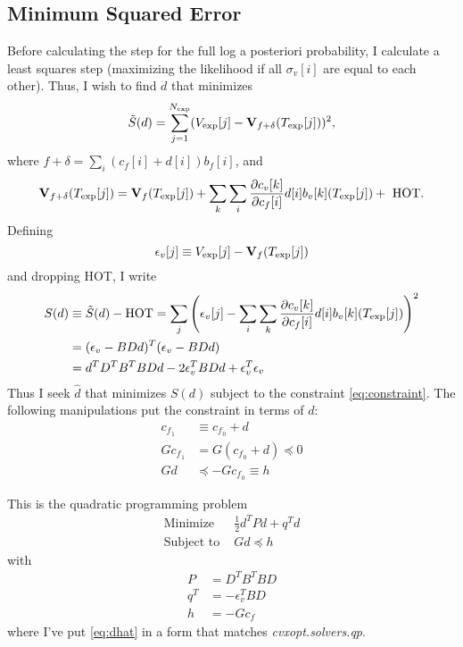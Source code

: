 \documentclass[11pt]{article}
\newcommand{\partiald}[2]{\frac{\partial #1}{\partial #2}}
\newcommand\Vt{\mathbf{V}}
\newcommand\vexp{V_{\rm{exp}}}
\newcommand\texp{T_{\rm{exp}}}
\newcommand\cf{c_f}
\newcommand\cv{c_v}
\newcommand\fbasis{b_f}
\newcommand\vbasis{b_v}
\newcommand\epv{\epsilon_v}
\begin{document}
\subsection{Minimum Squared Error}
\label{sec:minsq}

Before calculating the step for the full log a posteriori probability,
I calculate a least squares step (maximizing the likelihood if all
$\sigma_v[i]$ are equal to each other).  Thus, I wish to find $d$ that
minimizes
\begin{equation}
  \label{eq:ssq}
  \tilde S(d) = \sum_{j=1}^{N_{\rm exp}} (\vexp[j] - \Vt_{f+\delta}(\texp[j]))^2,
\end{equation}
where $f+\delta = \sum_i (\cf[i] + d[i])\fbasis[i]$, and 
\begin{equation}
  \label{eq:taylor}
  \Vt_{f+\delta}(\texp[j]) = \Vt_f(\texp[j]) +
  \sum_k \sum_i \partiald{\cv[k]}{\cf[i]}d[i]\vbasis[k](\texp[j])
  +\text{ HOT}.
\end{equation}
Defining
\begin{equation}
  \label{eq:epsilon}
  \epv[j] \equiv \vexp[j] - \Vt_f(\texp[j])
\end{equation}
and dropping HOT, I write
\begin{align}
  S(d) &\equiv \tilde S(d) - \text{HOT} = \sum_j \left( \epv[j] -
  \sum_i \sum_k \partiald{\cv[k]}{\cf[i]}d[i]\vbasis[k](\texp[j])
  \right)^2 \nonumber \\
  \label{eq:sd}
  &= (\epv - BDd)^T(\epv - BDd)\\
  &= d^TD^TB^TBDd - 2 \epv^TBDd + \epv^T\epv \nonumber
\end{align}
Thus I seek $\hat d$ that minimizes $S(d)$ subject to the constraint
\eqref{eq:constraint}.  The following manipulations put the constraint
in terms of $d$:
\begin{align*}
  \cf{_{_1}} &\equiv \cf{_{_0}} + d \\
  G \cf{_{_1}} &= G \left( \cf{_{_0}} + d \right) \preceq 0 \\
  G d &\preceq -G \cf{_{_0}} \equiv h
\end{align*}


This is the quadratic programming problem
\begin{subequations}
  \label{eq:dhat}
  \begin{align}
    \text{Minimize } & \frac{1}{2} d^T P d + q^T d \\
  \label{eq:dhatb}
    \text{Subject to } & Gd \preceq h
  \end{align}
\end{subequations}
with
\begin{align*}
  P &= D^TB^TBD \\
  q^T &= -\epv^TBD \\
  h &= -G\cf
\end{align*}
where I've put \eqref{eq:dhat} in a form that matches
\emph{cvxopt.solvers.qp}.
\end{document}
